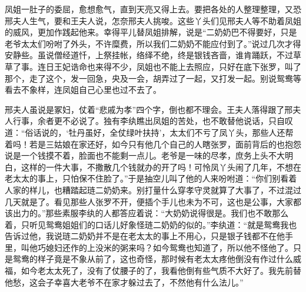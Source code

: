 \begin{parag}
    凤姐一肚子的委屈，愈想愈气，直到天亮又得上去。要把各处的人整理整理，又恐邢夫人生气，要和王夫人说，怎奈邢夫人挑唆。这些丫头们见邢夫人等不助着凤姐的威风，更加作践起他来。幸得平儿替凤姐排解，说是“二奶奶巴不得要好，只是老爷太太们吩咐了外头，不许糜费，所以我们二奶奶不能应付到了。”说过几次才得安静些。虽说僧经道忏，上祭挂帐，络绎不绝，终是银钱吝啬，谁肯踊跃，不过草草了事。连日王妃诰命也来得不少，凤姐也不能上去照应，只好在底下张罗，叫了那个，走了这个，发一回急，央及一会，胡弄过了一起，又打发一起。别说鸳鸯等看去不象样，连凤姐自己心里也过不去了。
\end{parag}


\begin{parag}
    邢夫人虽说是冢妇，仗着“悲戚为孝”四个字，倒也都不理会。王夫人落得跟了邢夫人行事，余者更不必说了。独有李纨瞧出凤姐的苦处，也不敢替他说话，只自叹道：“俗话说的，‘牡丹虽好，全仗绿叶扶持’，太太们不亏了凤丫头，那些人还帮着吗！若是三姑娘在家还好，如今只有他几个自己的人瞎张罗，面前背后的也抱怨说是一个钱摸不着，脸面也不能剩一点儿。老爷是一味的尽孝，庶务上头不大明白，这样的一件大事，不撒散几个钱就办的开了吗！可怜凤丫头闹了几年，不想在老太太的事上，只怕保不住脸了。”于是抽空儿叫了他的人来吩咐道：“你们别看着人家的样儿，也糟踏起琏二奶奶来。别打量什么穿孝守灵就算了大事了，不过混过几天就是了。看见那些人张罗不开，便插个手儿也未为不可，这也是公事，大家都该出力的。”那些素服李纨的人都答应着说：“大奶奶说得很是。我们也不敢那么着，只听见鸳鸯姐姐们的口话儿好象怪琏二奶奶的似的。”李纨道：“就是鸳鸯我也告诉过他，我说琏二奶奶并不是在老太太的事上不用心，只是银子钱都不在他手里，叫他巧媳妇还作的上没米的粥来吗？如今鸳鸯也知道了，所以他不怪他了。只是鸳鸯的样子竟是不象从前了，这也奇怪，那时候有老太太疼他倒没有作过什么威福，如今老太太死了，没有了仗腰子的了，我看他倒有些气质不大好了。我先前替他愁，这会子幸喜大老爷不在家才躲过去了，不然他有什么法儿。”
\end{parag}


